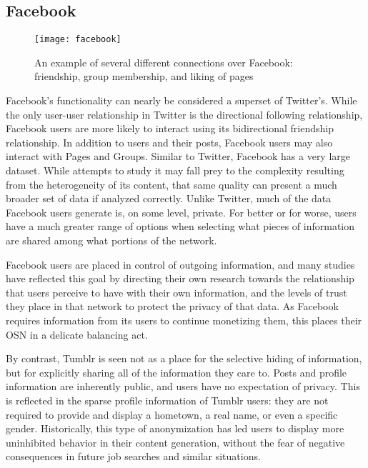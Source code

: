 \subsection{Facebook}
\begin{figure}[bht]
\centering
 \texttt{[image: facebook]}
 \caption{An example of several different connections over Facebook: friendship, group membership, and liking of pages}
 \label{fig:facebook}
\end{figure}
Facebook's functionality can nearly be considered a superset of Twitter's.  
While the only user-user relationship in Twitter is the directional following 
relationship, Facebook users are more likely to interact using its 
bidirectional friendship relationship.  In addition to users and their 
posts, Facebook users may also interact with Pages and Groups.  
Similar to Twitter, Facebook has a very large dataset.  While attempts 
to study it may fall prey to the complexity resulting from the 
heterogeneity of its content, that same quality can present a much 
broader set of data if analyzed correctly.  Unlike Twitter, much of 
the data Facebook users generate is, on some level, private.  For 
better or for worse, users have a much greater range of options when 
selecting what pieces of information are shared among what portions 
of the network.


Facebook users are placed in control of outgoing information, 
and many studies have reflected this goal by directing their own 
research\cite{dwyer2007trust, lipford2008understanding}
towards the relationship that users perceive to have with their own 
information, and the levels of trust they place in that network to 
protect the privacy of that data.  As Facebook requires information 
from its users to continue monetizing them, this places their OSN in 
a delicate balancing act.


By contrast, Tumblr is seen not as a place for the selective hiding of 
information\cite{liu2011analyzing}, but for explicitly sharing all of 
the information they care to.  Posts and profile information are 
inherently public, and users have no expectation of privacy.  This is 
reflected in the sparse profile information of Tumblr users: they are 
not required to provide and display a hometown, a real name, or even a 
specific gender\cite{drager2012trans}.  Historically, this type of 
anonymization\cite{alexander2002introduction} has led users to display 
more uninhibited behavior in their content generation, without the 
fear of negative consequences in future job searches and similar 
situations.

